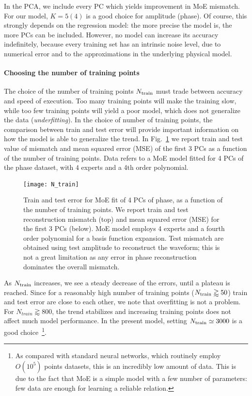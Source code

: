 In the PCA, we include every PC which yields improvement in MoE mismatch. For our model, $K = 5(4)$ is a good choice for amplitude (phase).
Of course, this strongly depends on the regression model: the more precise the model is, the more PCs can be included.
However, no model can increase its accuracy indefinitely, because every training set has an intrinsic noise level, due to numerical error and to the approximations in the underlying physical model.
\paragraph{Choosing the number of training points}
\label{par:N_train}
The choice of the number of training points $N_{\rm train}$ must trade between accuracy and speed of execution. 
Too many training points will make the training slow, while too few training points will yield a poor model, which does 
not generalize the data ({\it underfitting}). In the choice of number of training points, the comparison between train and 
test error will provide important information on how the model is able to generalize the trend.
In Fig.~\ref{fig:N_train} we report train and test value of mismatch and mean squared error (MSE) of the 
first 3 PCs as a function of the number of training points. Data refers to a MoE model fitted for 4 PCs of the phase dataset, with $4$ experts and a 4th order polynomial. 
\begin{figure}
	\centering
    \texttt{[image: N\_train]}
	\caption{Train and test error for MoE fit of 4 PCs of phase, as a function of the number of training points. 
	We report train and test reconstruction mismatch (top) and mean squared error (MSE) for the first 3 PCs (below). 
	MoE model employs 4 experts and a fourth order polynomial for a basis function expansion. Test mismatch are obtained using 
	test amplitude to reconstruct the waveform; this is not a great limitation as any error in phase reconstruction dominates the overall mismatch.
    }
	\label{fig:N_train}
\end{figure}
%
As $N_{\rm train}$ increases, we see a steady decrease of the errors, until a plateau is reached.
Since for a reasonably high number of training points ($N_{\rm train} \gtrapprox 50$) train and test error 
are close to each other, we note that overfitting is not a problem.
For $N_{train} \gtrapprox 800$, the trend stabilizes and increasing training points 
does not affect much model performance. In the present model, setting $N_{\rm train} \simeq \SI{3000}{}$ 
is a good choice~\footnote{As compared with standard neural networks, which routinely employ $O(10^5)$ 
points datasets, this is an incredibly low amount of data. This is due to the fact that MoE is a simple 
model with a few number of parameters: few data are enough for learning a reliable relation.}.
